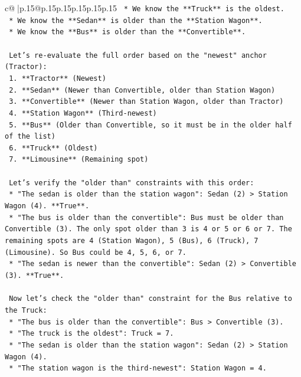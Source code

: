 \documentclass{article}
\begin{document}
{\begin{supertabular}{c@{$\;$}|p{.15\linewidth}@{}p{.15\linewidth}p{.15\linewidth}p{.15\linewidth}p{.15\linewidth}p{.15\linewidth}}
{{{\texttt{    *   We know the **Truck** is the oldest.} \\
\texttt{    *   We know the **Sedan** is older than the **Station Wagon**.} \\
\texttt{    *   We know the **Bus** is older than the **Convertible**.} \\
\\ 
\texttt{    Let's re{-}evaluate the full order based on the "newest" anchor (Tractor):} \\
\texttt{    1.  **Tractor** (Newest)} \\
\texttt{    2.  **Sedan** (Newer than Convertible, older than Station Wagon)} \\
\texttt{    3.  **Convertible** (Newer than Station Wagon, older than Tractor)} \\
\texttt{    4.  **Station Wagon** (Third{-}newest)} \\
\texttt{    5.  **Bus** (Older than Convertible, so it must be in the older half of the list)} \\
\texttt{    6.  **Truck** (Oldest)} \\
\texttt{    7.  **Limousine** (Remaining spot)} \\
\\ 
\texttt{    Let's verify the "older than" constraints with this order:} \\
\texttt{    *   "The sedan is older than the station wagon": Sedan (2) > Station Wagon (4). **True**.} \\
\texttt{    *   "The bus is older than the convertible": Bus must be older than Convertible (3). The only spot older than 3 is 4 or 5 or 6 or 7. The remaining spots are 4 (Station Wagon), 5 (Bus), 6 (Truck), 7 (Limousine). So Bus could be 4, 5, 6, or 7.} \\
\texttt{    *   "The sedan is newer than the convertible": Sedan (2) > Convertible (3). **True**.} \\
\\ 
\texttt{    Now let's check the "older than" constraint for the Bus relative to the Truck:} \\
\texttt{    *   "The bus is older than the convertible": Bus > Convertible (3).} \\
\texttt{    *   "The truck is the oldest": Truck = 7.} \\
\texttt{    *   "The sedan is older than the station wagon": Sedan (2) > Station Wagon (4).} \\
\texttt{    *   "The station wagon is the third{-}newest": Station Wagon = 4.} \\
}}}
\end{supertabular}}
\end{document}
